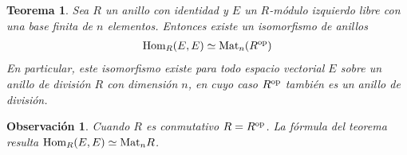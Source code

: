 \documentclass{report}
\newcommand{\Hom}{\textnormal{Hom}}
\newcommand{\Mat}{\textnormal{Mat}}
\newtheorem{theorem}{Teorema}
\newtheorem{remark}{Observación}
\begin{document}
  \begin{theorem}
    \label{theorem:isomorphismBetweenMatrixAndHomomorphismRings}
    Sea \(R\) un anillo con identidad y \(E\) un \(R\)-módulo izquierdo libre con una base finita de \(n\) elementos.
    Entonces existe un isomorfismo de anillos
    \begin{align}
      \Hom_R(E, E)
      \simeq
      \Mat_n(R^{\textnormal{op}})
    \end{align}
    En particular, este isomorfismo existe para todo espacio vectorial \(E\) sobre un anillo de división \(R\) con dimensión \(n\), en cuyo caso \(R^{\textnormal{op}}\) también es un anillo de división.
  \end{theorem}
  \begin{remark}
    Cuando \(R\) es conmutativo \(R = R^{\textnormal{op}}\).
    La fórmula del teorema resulta \(\Hom_R(E, E) \simeq \Mat_n R\).
  \end{remark}
\end{document}

